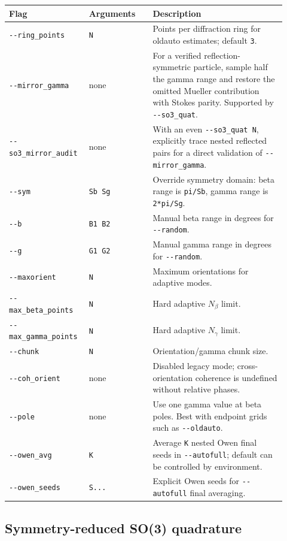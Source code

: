 \documentclass[
  10pt,
  a4paper,
]{article}
\begin{document}
\begin{longtable}[]{@{}L{0.24\linewidth}L{0.22\linewidth}L{0.46\linewidth}@{}}
\toprule\noalign{}
Flag & Arguments & Description \\
\midrule\noalign{}
\endhead
\bottomrule\noalign{}
\endlastfoot
\texttt{-\/-ring\_points} & \texttt{N} & Points per diffraction ring for
oldauto estimates; default \texttt{3}. \\
\texttt{-\/-mirror\_gamma} & none & For a verified reflection-symmetric
particle, sample half the gamma range and restore the omitted Mueller
contribution with Stokes parity. Supported by \texttt{-\/-so3\_quat}. \\
\texttt{-\/-so3\_mirror\_audit} & none & With an even
\texttt{-\/-so3\_quat N}, explicitly trace nested reflected pairs for a
direct validation of \texttt{-\/-mirror\_gamma}. \\
\texttt{-\/-sym} & \texttt{Sb\ Sg} & Override symmetry domain: beta
range is \texttt{pi/Sb}, gamma range is \texttt{2*pi/Sg}. \\
\texttt{-\/-b} & \texttt{B1\ B2} & Manual beta range in degrees for
\texttt{-\/-random}. \\
\texttt{-\/-g} & \texttt{G1\ G2} & Manual gamma range in degrees for
\texttt{-\/-random}. \\
\texttt{-\/-maxorient} & \texttt{N} & Maximum orientations for adaptive
modes. \\
\texttt{-\/-max\_beta\_points} & \texttt{N} & Hard adaptive
\(N_\beta\) limit. \\
\texttt{-\/-max\_gamma\_points} & \texttt{N} & Hard adaptive
\(N_\gamma\) limit. \\
\texttt{-\/-chunk} & \texttt{N} & Orientation/gamma chunk size. \\
\texttt{-\/-coh\_orient} & none & Disabled legacy mode; cross-orientation
coherence is undefined without relative phases. \\
\texttt{-\/-pole} & none & Use one gamma value at beta poles. Best with
endpoint grids such as \texttt{-\/-oldauto}. \\
\texttt{-\/-owen\_avg} & \texttt{K} & Average \texttt{K} nested Owen
final seeds in \texttt{-\/-autofull}; default can be controlled by
environment. \\
\texttt{-\/-owen\_seeds} & \texttt{S...} & Explicit Owen seeds for
\texttt{-\/-autofull} final averaging. \\
\end{longtable}

\subsection{Symmetry-reduced SO(3) quadrature}
\end{document}
